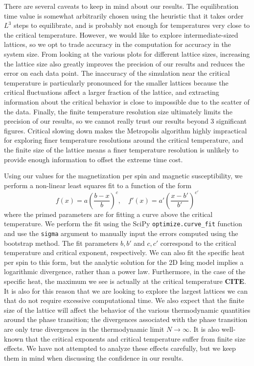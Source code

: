 \documentclass[twocolumn,aps,prl]{revtex4-1} %
\begin{document}
There are several caveats to keep in mind about our results. The equilibration time value is somewhat arbitrarily chosen using the heuristic that it takes order $L^3$ steps to equilibrate, and is probably not enough for temperatures very close to the critical temperature. However, we would like to explore intermediate-sized lattices, so we opt to trade accuracy in the computation for accuracy in the system size. From looking at the various plots for different lattice sizes, increasing the lattice size also greatly improves the precision of our results and reduces the error on each data point. The inaccuracy of the simulation near the critical temperature is particularly pronounced for the smaller lattices because the critical fluctuations affect a larger fraction of the lattice, and extracting information about the critical behavior is close to impossible due to the scatter of the data. Finally, the finite temperature resolution size ultimately limits the precision of our results, so we cannot really trust our results beyond 3 significant figures. Critical slowing down makes the Metropolis algorithm highly impractical for exploring finer temperature resolutions around the critical temperature, and the finite size of the lattice means a finer temperature resolution is unlikely to provide enough information to offset the extreme time cost.

Using our values for the magnetization per spin and magnetic susceptibility, we perform a non-linear least squares fit to a function of the form
\begin{equation}
	f(x) = a\left(\frac{b-x}{b}\right)^c, \quad f'(x) = a'\left(\frac{x-b'}{b'}\right)^{c'}
\end{equation}
where the primed parameters are for fitting a curve above the critical temperature. We perform the fit using the SciPy \texttt{optimize.curve\_fit} function and use the \texttt{sigma} argument to manually input the errors computed using the bootstrap method. The fit parameters $b,b'$ and $c,c'$ correspond to the critical temperature and critical exponent, respectively. We can also fit the specific heat per spin to this form, but the analytic solution for the 2D Ising model implies a logarithmic divergence, rather than a power law. Furthermore, in the case of the specific heat, the maximum we see is actually at the critical temperature \textbf{CITE}. It is also for this reason that we are looking to explore the largest lattices we can that do not require excessive computational time. We also expect that the finite size of the lattice will affect the behavior of the various thermodynamic quantities around the phase transition; the divergences associated with the phase transition are only true divergences in the thermodynamic limit $N \to \infty$. It is also well-known that the critical exponents and critical temperature suffer from finite size effects. We have not attempted to analyze these effects carefully, but we keep them in mind when discussing the confidence in our results.
\end{document}
